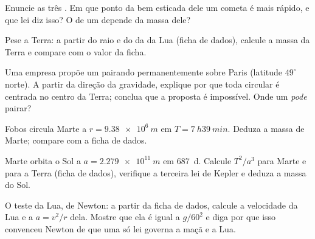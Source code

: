 \begin{exercise}[$\star$]\label{exo:g12:satellites-kepler:5}
Enuncie as três . Em que ponto da  bem esticada dele um cometa é
mais rápido, e que lei diz isso? O  de um  depende da massa dele?
\end{exercise}

\begin{exercise}[$\star\star$]\label{exo:g12:satellites-kepler:6}
Pese a Terra: a partir do raio e do  da  da Lua (ficha de dados),
calcule a massa da Terra e compare com o valor da ficha.
\end{exercise}

\begin{exercise}[$\star\star$]\label{exo:g12:satellites-kepler:7}
Uma empresa propõe um  pairando permanentemente sobre Paris (latitude
$49^\circ$ norte). A partir da direção da gravidade, explique por que toda 
circular é centrada no centro da Terra; conclua que a proposta é impossível. Onde um
 \emph{pode} pairar?
\end{exercise}

\begin{exercise}[$\star\star$]\label{exo:g12:satellites-kepler:8}
Fobos circula Marte a $r = \qty{9.38e6}{m}$ em $T = \qty{7}{h} \qty{39}{min}$. Deduza
a massa de Marte; compare com a ficha de dados.
\end{exercise}

\begin{exercise}[$\star\star$]\label{exo:g12:satellites-kepler:9}
Marte orbita o Sol a $a = \qty{2.279e11}{m}$ em \qty{687}{d}. Calcule $T^2/a^3$ para
Marte e para a Terra (ficha de dados), verifique a terceira lei de Kepler e deduza a
massa do Sol.
\end{exercise}

\begin{exercise}[$\star\star$]\label{exo:g12:satellites-kepler:10}
O teste da Lua, de Newton: a partir da ficha de dados, calcule a velocidade da Lua e a
 $a = v^2/r$ dela. Mostre que ela é igual a $g/60^2$ e diga por
que isso convenceu Newton de que uma só lei governa a maçã e a Lua.
\end{exercise}

